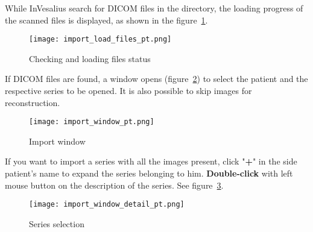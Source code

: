 \hspace{.2cm}


While InVesalius search for DICOM files in the directory, the loading progress of the scanned files is displayed, as shown in the figure~\ref{fig:ver_file}.

\begin{figure}[!htb]
\centering
\texttt{[image: import\_load\_files\_pt.png]}
\caption{Checking and loading files status}
\label{fig:ver_file}
\end{figure}

\newpage


If DICOM files are found, a window opens (figure~\ref{fig:win_import}) to select the patient and the respective series to be opened. It is also possible to
skip images for reconstruction.

\begin{figure}[!htb]
\centering
\texttt{[image: import\_window\_pt.png]}
\caption{Import window}
\label{fig:win_import}
\end{figure}

\newpage





If you want to import a series with all the images present, click "\textbf{+}" in the side patient's name to expand the series belonging to him. \textbf {Double-click} with left mouse button on the description of the series. See figure~\ref{fig:import_serie}.

\begin{figure}[!htb]
\centering
\texttt{[image: import\_window\_detail\_pt.png]}
\caption{Series selection}
\label{fig:import_serie}
\end{figure}
 

